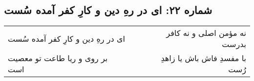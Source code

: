 \begin{center}
\section*{شماره ۲۲: ای در رهِ دین و کارِ کفر آمده سُست}
\label{sec:022}
\begin{longtable}{l p{0.5cm} r}
ای در رهِ دین و کارِ کفر آمده سُست
&&
نه مؤمن اصلی و نه کافر بدرست
\\
بر روی و ریا طاعت تو معصیت است
&&
با مفسدِ فاش باش یا زاهدِ رُست
\\
\end{longtable}
\end{center}
